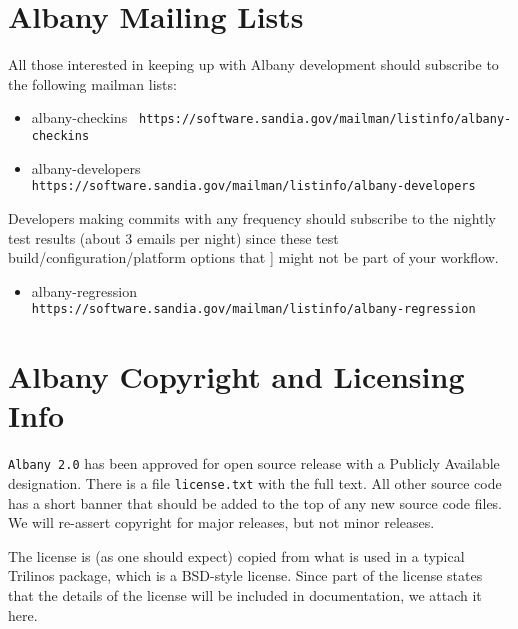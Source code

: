 \documentclass[pdf,12pt,report,strict]{SANDreport}
\theoremstyle{remark}
\begin{document}
\chapter{Albany Mailing Lists}
All those interested in keeping up with Albany development should subscribe
to the following mailman lists:
\begin{itemize}
\item albany-checkins  \texttt{ https://software.sandia.gov/mailman/listinfo/albany-checkins}
\item albany-developers  \texttt{ https://software.sandia.gov/mailman/listinfo/albany-developers}
\end{itemize}
Developers making commits with any frequency should subscribe to the nightly test results
(about 3 emails per night) since these test build/configuration/platform options that ]
might not be part of your workflow.
\begin{itemize}
\item albany-regression  \texttt{ https://software.sandia.gov/mailman/listinfo/albany-regression}
\end{itemize}


\chapter{Albany Copyright and Licensing Info}

\texttt{Albany 2.0} has been approved for open source release with a
Publicly Available designation. There is a file \texttt{license.txt} 
with the full text. All other source code has a short banner that should
be added to the top of any new source code files. We will re-assert 
copyright for major releases, but not minor releases. 

The license is (as one should expect) copied from what is used in a
typical Trilinos package, which is a BSD-style license. 
Since part of the license states that the details of the license 
will be included in documentation, we attach it here.
\end{document}
